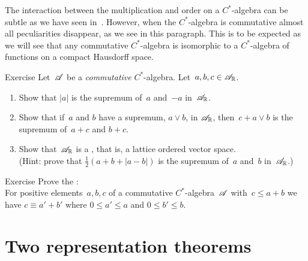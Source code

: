 \documentclass[a]{subfiles}
\begin{document}
\begin{parsec}%
\begin{point}%
The interaction between the multiplication and order
on a $C^*$-algebra can be subtle
as we have seen in~\TODO{}.  However,
when the $C^*$-algebra is commutative
almost all peculiarities disappear,
as we see in this paragraph.
This is to be expected
as we will see that any commutative $C^*$-algebra
is isomorphic to a $C^*$-algebra
of functions on a compact Hausdorff space.
\end{point}
\begin{point}{Exercise}%
Let~$\mathscr{A}$ be a \emph{commutative} $C^*$-algebra.
Let~$a,b,c\in\mathscr{A}_{\mathbb{R}}$.
\begin{enumerate}
\item
Show that $\left| a\right|$ is the supremum of~$a$ and~$-a$
in~$\mathscr{A}_{\mathbb{R}}$.
\item
Show that if~$a$ and $b$ have a supremum, $a\vee b$, in $\mathscr{A}_{\mathbb{R}}$,
then~$c+a\vee b$ is the supremum of~$a+c$ and $b+c$.
\item
Show that~$\mathscr{A}_{\mathbb{R}}$ is a ,
that is,  a lattice ordered vector space.\\
(Hint: prove that $\frac{1}{2}(a+b+\left|a-b\right|)$
is the supremum of~$a$ and~$b$ in~$\mathscr{A}_{\mathbb{R}}$.)
\end{enumerate}
\end{point}
\begin{point}{Exercise}%
Prove the :\\
For positive elements~$a,b,c$ of a commutative $C^*$-algebra~$\mathscr{A}$
with~$c\leq a+b$
we have $c\equiv a'+b'$
where  $0\leq a'\leq a$ and $0\leq b'\leq b$.
\end{point}
\end{parsec}
\section{Two representation theorems}
\end{document}
